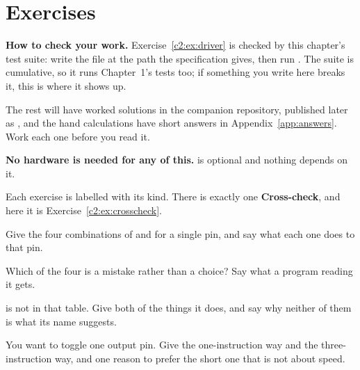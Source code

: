 
\section{Exercises}
\label{c2:sec:exercises}

\begin{aside}
\textbf{How to check your work.} Exercise~\ref{c2:ex:driver} is checked by this chapter's test
suite: write the file at the path the specification gives, then run . The suite is
cumulative, so it runs Chapter~1's  tests too; if something you write here
breaks it, this is where it shows up.

The rest will have worked solutions in the companion repository, published later as
, and the hand calculations have short answers in
Appendix~\ref{app:answers}. Work each one before you read it.

\textbf{No hardware is needed for any of this.}  is optional and nothing
depends on it.
\end{aside}

Each exercise is labelled with its kind. There is exactly one \textbf{Cross-check}, and here it is
Exercise~\ref{c2:ex:crosscheck}.

\label{c2:ex:states}
\begin{parts}
  \item Give the four combinations of  and  for a single pin, and say what
    each one does to that pin.
  \item Which of the four is a mistake rather than a choice? Say what a program reading it gets.
  \item {} is not in that table. Give both of the things it does, and say why neither of
    them is what its name suggests.
  \item You want to toggle one output pin. Give the one-instruction way and the three-instruction
    way, and one reason to prefer the short one that is not about speed.
\end{parts}

